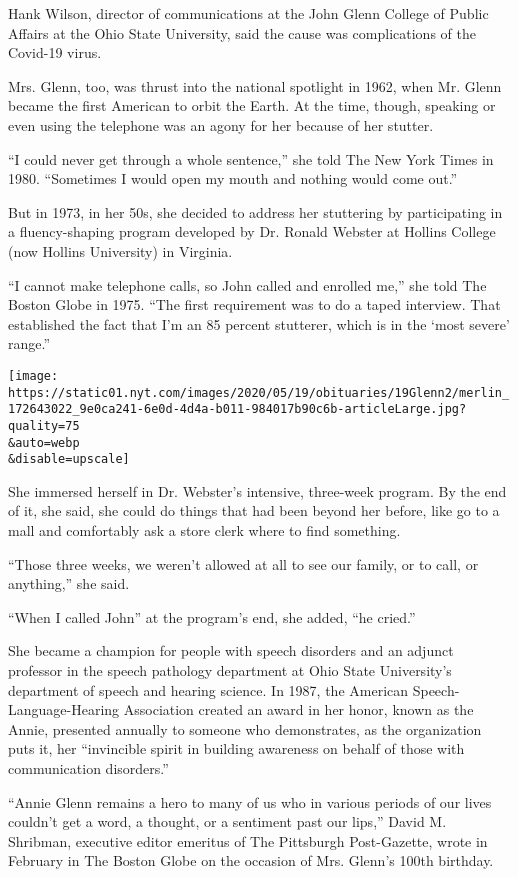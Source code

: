 Hank Wilson, director of communications at the John Glenn College of
Public Affairs at the Ohio State University, said the cause was
complications of the Covid-19 virus.

Mrs. Glenn, too, was thrust into the national spotlight in 1962, when
Mr. Glenn became the first American to orbit the Earth. At the time,
though, speaking or even using the telephone was an agony for her
because of her stutter.

``I could never get through a whole sentence,'' she told The New York
Times in 1980. ``Sometimes I would open my mouth and nothing would come
out.''

But in 1973, in her 50s, she decided to address her stuttering by
participating in a fluency-shaping program developed by Dr. Ronald
Webster at Hollins College (now Hollins University) in Virginia.

``I cannot make telephone calls, so John called and enrolled me,'' she
told The Boston Globe in 1975. ``The first requirement was to do a taped
interview. That established the fact that I'm an 85 percent stutterer,
which is in the `most severe' range.''

\texttt{[image: https://static01.nyt.com/images/2020/05/19/obituaries/19Glenn2/merlin\_172643022\_9e0ca241-6e0d-4d4a-b011-984017b90c6b-articleLarge.jpg?quality=75\\\&auto=webp\\\&disable=upscale]}

She immersed herself in Dr. Webster's intensive, three-week program. By
the end of it, she said, she could do things that had been beyond her
before, like go to a mall and comfortably ask a store clerk where to
find something.

``Those three weeks, we weren't allowed at all to see our family, or to
call, or anything,'' she said.

``When I called John'' at the program's end, she added, ``he cried.''

She became a champion for people with speech disorders and an adjunct
professor in the speech pathology department at Ohio State University's
department of speech and hearing science. In 1987, the American
Speech-Language-Hearing Association created an award in her honor, known
as the Annie, presented annually to someone who demonstrates, as the
organization puts it, her ``invincible spirit in building awareness on
behalf of those with communication disorders.''

``Annie Glenn remains a hero to many of us who in various periods of our
lives couldn't get a word, a thought, or a sentiment past our lips,''
David M. Shribman, executive editor emeritus of The Pittsburgh
Post-Gazette, wrote in February in The Boston Globe on the occasion of
Mrs. Glenn's 100th birthday.

